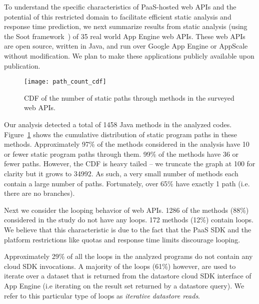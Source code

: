 
To understand the specific characteristics of PaaS-hosted web APIs and the potential
of this restricted domain to facilitate efficient static analysis and response time 
prediction,  we next summarize results from static analysis (using the Soot
framework~\cite{Vallee-Rai:2010:SJB:1925805.1925818}) of 
35 real world App Engine web APIs. These web APIs are open 
source, written in Java, and run over Google App Engine or AppScale without modification.
We plan to make these applications publicly available upon publication.  

\begin{figure}
\centering
\texttt{[image: path\_count\_cdf]}
\caption{CDF of the number of static paths through methods in the surveyed web APIs.
\label{fig:path_count_cdf}
}
\vspace{-0.2in}
\end{figure}

Our analysis detected a total of 1458 Java methods in the analyzed codes.
Figure~\ref{fig:path_count_cdf} shows the cumulative distribution of 
static program paths in these methods.
Approximately 97\% of the methods considered in the analysis have 10 or fewer 
static program paths through them.  99\% of 
the methods have 36 or fewer paths.
However, the CDF is heavy tailed --
we truncate the graph at 100 for clarity but it grows to 34992. As such, 
a very small number of methods 
each contain a large number of paths.
Fortunately, over 65\% have exactly 1 path (i.e. there are no branches).

Next we consider the looping behavior of web APIs.  1286 of the methods (88\%)
considered in the study
do not have any loops. 172 methods (12\%) contain loops. 
We believe that this characteristic is due to the fact that 
the PaaS SDK and the platform restrictions like quotas and response time limits 
discourage looping.

Approximately 29\% of all the loops in 
the analyzed programs do not contain any cloud SDK invocations. 
A majority of the loops (61\%) however, are
used to iterate over a dataset that is returned from the datastore cloud SDK interface 
of App Engine (i.e iterating on the result set 
returned by a datastore query). We refer to this particular type of 
loops as \textit{iterative datastore reads}. 

